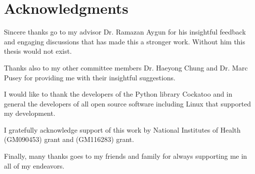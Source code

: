 \chapter*{Acknowledgments}

Sincere thanks go to my advisor Dr. Ramazan Aygun for his insightful feedback and engaging discussions that has made this a stronger work. Without him this thesis would not exist.

Thanks also to my other committee members Dr. Haeyong Chung and Dr. Marc Pusey for providing me with their insightful suggestions.

I would like to thank the developers of the Python library Cockatoo and in general the developers of all open source software including Linux that supported my development.

I gratefully acknowledge support of this work by National Institutes of Health (GM090453) grant and (GM116283) grant. 

Finally, many thanks goes to my friends and family for always supporting me in all of my endeavors.
 